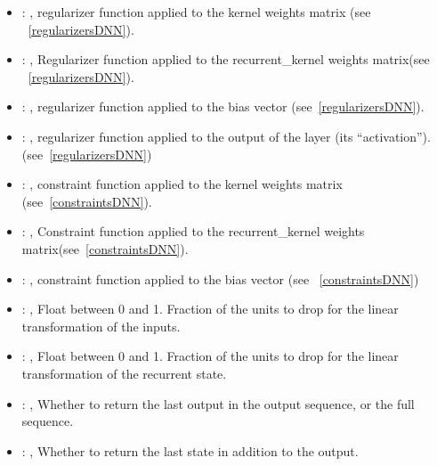 \begin{itemize}
\begin{itemize}
        \item {}: , 
          regularizer function applied to the kernel weights matrix (see ~\ref{regularizersDNN}).

        \item {}: , 
          Regularizer function applied to the recurrent\_kernel weights matrix(see
          ~\ref{regularizersDNN}).

        \item {}: , 
          regularizer function applied to the bias vector (see~\ref{regularizersDNN}).

        \item {}: , 
          regularizer function applied to the output         of the layer (its ``activation'').
          (see~\ref{regularizersDNN})

        \item {}: , 
          constraint function applied to the kernel weights matrix (see~\ref{constraintsDNN}).

        \item {}: , 
          Constraint function applied to the recurrent\_kernel weights
          matrix(see~\ref{constraintsDNN}).

        \item {}: , 
          constraint function applied to the bias vector (see ~\ref{constraintsDNN})

        \item {}: , 
          Float between 0 and 1. Fraction of the units to drop for the linear transformation of the
          inputs.

        \item {}: , 
          Float between 0 and 1. Fraction of the units to drop for the linear transformation of the
          recurrent state.

        \item {}: , 
          Whether to return the last output in the output sequence, or the full sequence.

        \item {}: , 
          Whether to return the last state in addition to the output.


\end{itemize}
\end{itemize}
